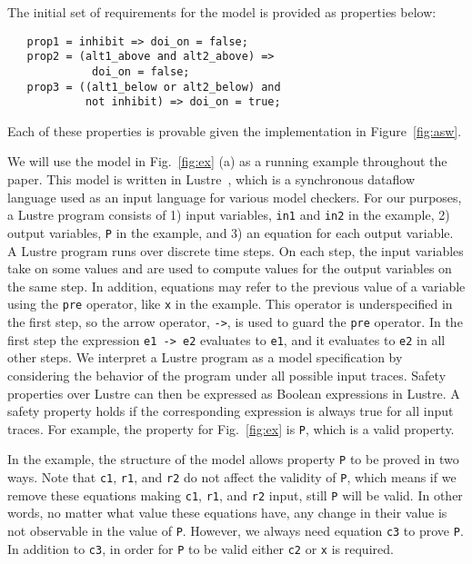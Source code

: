 The initial set of requirements for the model is provided as properties below: 

\begin{smaller}
\begin{verbatim}
   prop1 = inhibit => doi_on = false;
   prop2 = (alt1_above and alt2_above) => 
             doi_on = false;
   prop3 = ((alt1_below or alt2_below) and 
            not inhibit) => doi_on = true;
\end{verbatim}
\end{smaller}

\noindent Each of these properties is provable given the implementation in Figure~\ref{fig:asw}.  

\iffalse
{}

We will use the model in Fig.~\ref{fig:ex} (a) as
a running example throughout the paper. This model is written in Lustre~\cite{Halbwachs91:lustre}, which is a synchronous dataflow language used as an input language for various model checkers. For our purposes, a Lustre program
consists of 1) input variables, {\tt in1} and {\tt in2} in the example, 2) output
variables, {\tt P} in the example, and 3) an
equation for each output variable. A Lustre program runs over discrete
time steps. On each step, the input variables take on some values and
are used to compute values for the output variables on the same step.
In addition, equations may refer to the previous value of a variable
using the {\tt pre} operator, like {\tt x} in the example. This operator is underspecified in the
first step, so the arrow operator, {\tt ->}, is used to guard the
{\tt pre} operator. In the first step the expression {\tt e1 -> e2}
evaluates to {\tt e1}, and it evaluates to {\tt e2} in all other steps. We interpret a Lustre program as a model specification by considering
the behavior of the program under all possible input traces. Safety
properties over Lustre can then be expressed as Boolean expressions in
Lustre. A safety property holds if the corresponding expression is
always true for all input traces. For example, the property for
Fig.~\ref{fig:ex} is {\tt P}, which is a valid property.

In the example, the structure of the model allows property {\tt P} to be proved in two ways.
Note that {\tt c1}, {\tt r1}, and {\tt r2} do not affect the validity of {\tt P}, which means
if we remove these equations making {\tt c1}, {\tt r1}, and {\tt r2} input, still {\tt P} will be valid.
In other words, no matter what value these equations have, any change in their value is not observable in the value of {\tt P}.
However, we always need equation {\tt c3} to prove {\tt P}. In addition to {\tt c3}, in order for {\tt P} to be valid either {\tt c2} or {\tt x} is required.

